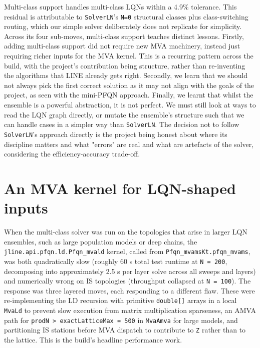 Multi-class support handles multi-class LQNs within a 4.9\% tolerance. This residual is attributable to \texttt{SolverLN}'s \texttt{N=0} structural classes plus class-switching routing, which our simple solver deliberately does not replicate for simplicity. Across its four sub-moves, multi-class support teaches distinct lessons. Firstly, adding multi-class support did not require new MVA machinery, instead just requiring richer inputs for the MVA kernel. This is a recurring pattern across the build, with the project's contribution being structure, rather than re-inventing the algorithms that LINE already gets right. Secondly, we learn that we should not always pick the first correct solution as it may not align with the goals of the project, as seen with the mini-PFQN approach. Finally, we learnt that whilst the ensemble is a powerful abstraction, it is not perfect. We must still look at ways to read the LQN graph directly, or mutate the ensemble's structure such that we can handle cases in a simpler way than \texttt{SolverLN}. The decision not to follow \texttt{SolverLN}'s approach directly is the project being honest about where its discipline matters and what "errors" are real and what are artefacts of the solver, considering the efficiency-accuracy trade-off.




\section{An MVA kernel for LQN-shaped inputs}
\label{sec:contrib-step4}

When the multi-class solver was run on the topologies that arise in larger LQN ensembles, such as large population models or deep chains, the \texttt{jline.api.pfqn.ld.Pfqn\_mvald} kernel, called from \texttt{Pfqn\_mvamsKt.pfqn\_mvams}, was both quadratically slow (roughly 60 s total test runtime at \texttt{N = 200}, decomposing into approximately 2.5 s per layer solve across all sweeps and layers) and numerically wrong on IS topologies (throughput collapsed at \texttt{N = 100}). The response was three layered moves, each responding to a different flaw. These were re-implementing the LD recursion with primitive \texttt{double[]} arrays in a local \texttt{MvaLd} to prevent slow execution from matrix multiplication sparseness, an AMVA path for \texttt{prodN > exactLatticeMax = 500} in \texttt{MvaAmva} for large models, and partitioning IS stations before MVA dispatch to contribute to \texttt{Z} rather than to the lattice. This is the build's headline performance work.

